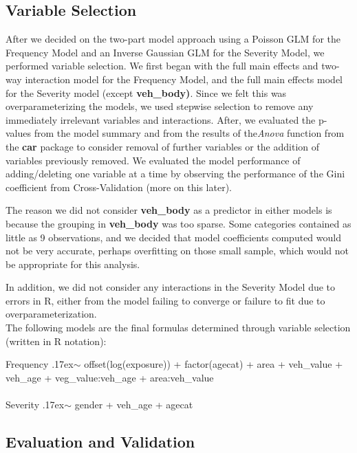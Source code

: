 \documentclass[a4paper]{article}\usepackage[]{graphicx}\usepackage[]{color}
\begin{document}
\subsection*{Variable Selection}

After we decided on the two-part model approach using a Poisson GLM for the Frequency Model and an Inverse Gaussian GLM for the Severity Model, we performed variable selection. We first began with the full main effects and two-way interaction model for the Frequency Model, and the full main effects model for the Severity model (except \textbf{veh\_body)}. Since we felt this was overparameterizing the models, we used stepwise selection to remove any immediately irrelevant variables and interactions. After, we evaluated the p-values from the model summary and from the results of the\textit{Anova} function from the \textbf{car} package to consider removal of further variables  or the addition of variables previously removed. We evaluated the model performance of adding/deleting one variable at a time by observing the performance of the Gini coefficient from Cross-Validation (more on this later).

The reason we did not consider \textbf{veh\_body} as a predictor in either models is because the grouping in \textbf{veh\_body} was too sparse. Some categories contained as little as 9 observations, and we decided that model coefficients computed would not be very accurate, perhaps overfitting on those small sample, which would not be appropriate for this analysis. 

In addition, we did not consider any interactions in the Severity Model due to errors in R, either from the model failing to converge or failure to fit due to overparameterization.
\\

The following models are the final formulas determined through variable selection (written in R notation):

\begin{center} 
Frequency {\raise.17ex\hbox{$\scriptstyle\sim$}}  offset(log(exposure)) + factor(agecat) + area + veh\_value + veh\_age + veg\_value:veh\_age + area:veh\_value \\ \\
Severity {\raise.17ex\hbox{$\scriptstyle\sim$}} gender + veh\_age + agecat
\end{center}

\subsection*{Evaluation and Validation}
\end{document}
